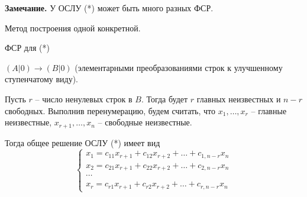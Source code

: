 \bigskip
\textbf{Замечание.} У ОСЛУ (*) может быть много разных ФСР.

Метод построения одной конкретной.

ФСР для (*)

$(A|0) \rightarrow (B|0)$ (элементарными преобразованиями строк к улучшенному ступенчатому виду).

Пусть $r$ -- число ненулевых строк в $B$. Тогда будет $r$ главных неизвестных и $n-r$ свободных. Выполнив перенумерацию, будем считать, что $x_1, \dots, x_r$ -- главные неизвестные, $x_{r+1}, \dots, x_n$ -- свободные неизвестные.

Тогда общее решение ОСЛУ (*) имеет вид
\begin{equation*}
\begin{cases}
x_1 = c_{11} x_{r+1} + c_{12} x_{r+2} + \dots + c_{1, n-r} x_n \\
x_2 = c_{21} x_{r+1} + c_{22} x_{r+2} + \dots + c_{2, n-r} x_n \\
\cdots \\
x_r = c_{r1} x_{r+1} + c_{r2} x_{r+2} + \dots + c_{r, n-r} x_n
\end{cases}
\end{equation*}


